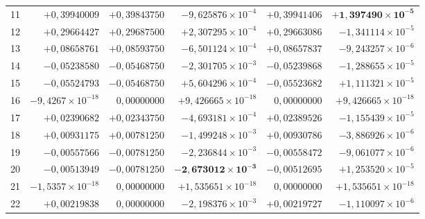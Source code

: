 \documentclass[11pt,a4paper]{article}
\begin{document}
\begin{table}[!htbp]
\begin{adjustbox}{max width=\textwidth}
\begin{tabular}{@{}crrrrr@{}}
        \rowcolor{rowpass}
        11 & $+0,39940009$ & $+0,39843750$ & $-9,625876\times 10^{-4}$ & $+0,39941406$ & $\mathbf{+1,397490\times 10^{-5}}$ \\
        12 & $+0,29664427$ & $+0,29687500$ & $+2,307295\times 10^{-4}$ & $+0,29663086$ & $-1,341114\times 10^{-5}$ \\
        13 & $+0,08658761$ & $+0,08593750$ & $-6,501124\times 10^{-4}$ & $+0,08657837$ & $-9,243257\times 10^{-6}$ \\
        14 & $-0,05238580$ & $-0,05468750$ & $-2,301705\times 10^{-3}$ & $-0,05239868$ & $-1,288655\times 10^{-5}$ \\
        15 & $-0,05524793$ & $-0,05468750$ & $+5,604296\times 10^{-4}$ & $-0,05523682$ & $+1,111321\times 10^{-5}$ \\
        16 & $-9,4267\times 10^{-18}$ & $0,00000000$ & $+9,426665\times 10^{-18}$ & $0,00000000$ & $+9,426665\times 10^{-18}$ \\
        17 & $+0,02390682$ & $+0,02343750$ & $-4,693181\times 10^{-4}$ & $+0,02389526$ & $-1,155439\times 10^{-5}$ \\
        18 & $+0,00931175$ & $+0,00781250$ & $-1,499248\times 10^{-3}$ & $+0,00930786$ & $-3,886926\times 10^{-6}$ \\
        19 & $-0,00557566$ & $-0,00781250$ & $-2,236844\times 10^{-3}$ & $-0,00558472$ & $-9,061077\times 10^{-6}$ \\
        20 & $-0,00513949$ & $-0,00781250$ & $\mathbf{-2,673012\times 10^{-3}}$ & $-0,00512695$ & $+1,253520\times 10^{-5}$ \\
        21 & $-1,5357\times 10^{-18}$ & $0,00000000$ & $+1,535651\times 10^{-18}$ & $0,00000000$ & $+1,535651\times 10^{-18}$ \\
        \rowcolor{rowfail}
        22 & $+0,00219838$ & $0,00000000$ & $-2,198376\times 10^{-3}$ & $+0,00219727$ & $-1,110097\times 10^{-6}$ \\
        \bottomrule
    \end{tabular}
    \end{adjustbox}
\end{table}
\end{document}
